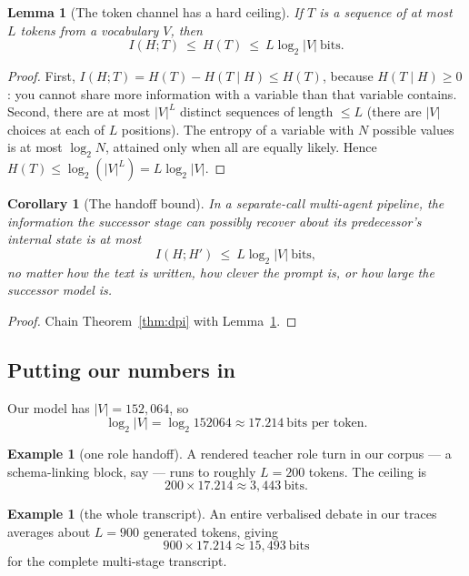 \documentclass[11pt]{article}
\newtheorem{lemma}[theorem]{Lemma}
\newtheorem{corollary}[theorem]{Corollary}
\theoremstyle{definition}
\newtheorem{example}[theorem]{Example}
\begin{document}
\begin{lemma}[The token channel has a hard ceiling]
\label{lem:ceiling}
If $T$ is a sequence of at most $L$ tokens from a vocabulary $V$, then
\[
I(H;T) \ \le\ H(T)\ \le\ L\log_2|V| \ \text{bits.}
\]
\end{lemma}

\begin{proof}
First, $I(H;T) = H(T) - H(T\mid H) \le H(T)$, because $H(T\mid H)\ge 0$: you cannot share more information with a variable than that variable contains. Second, there are at most $|V|^L$ distinct sequences of length $\le L$ (there are $|V|$ choices at each of $L$ positions). The entropy of a variable with $N$ possible values is at most $\log_2 N$, attained only when all are equally likely. Hence $H(T) \le \log_2(|V|^L) = L\log_2|V|$.
\end{proof}

\begin{corollary}[The handoff bound]
\label{cor:handoff}
In a separate-call multi-agent pipeline, the information the successor stage can possibly recover about its predecessor's internal state is at most
\[
I(H;H') \ \le\ L\log_2|V|\ \text{bits},
\]
no matter how the text is written, how clever the prompt is, or how large the successor model is.
\end{corollary}

\begin{proof}
Chain Theorem~\ref{thm:dpi} with Lemma~\ref{lem:ceiling}.
\end{proof}

\subsection{Putting our numbers in}

Our model has $|V| = 152{,}064$, so
\[
\log_2|V| = \log_2 152064 \approx 17.214 \ \text{bits per token.}
\]

\begin{example}[one role handoff]
A rendered teacher role turn in our corpus --- a schema-linking block, say --- runs to roughly $L = 200$ tokens. The ceiling is
\[
200 \times 17.214 \approx 3{,}443\ \text{bits}.
\]
\end{example}

\begin{example}[the whole transcript]
An entire verbalised debate in our traces averages about $L=900$ generated tokens, giving
\[
900 \times 17.214 \approx 15{,}493\ \text{bits}
\]
for the complete multi-stage transcript.
\end{example}
\end{document}
